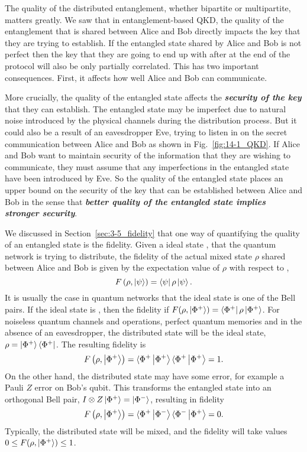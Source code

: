 The quality of the distributed entanglement, whether bipartite or multipartite, matters greatly.
We saw that in entanglement-based QKD, the quality of the entanglement that is shared between Alice and Bob directly impacts the key that they are trying to establish.
If the entangled state shared by Alice and Bob is not perfect then the key that they are going to end up with after at the end of the protocol will also be only partially correlated.
This has two important consequences.
First, it affects how well Alice and Bob can communicate.

More crucially, the quality of the entangled state affects the \textit{\textbf{security of the key}} that they can establish.
The entangled state may be imperfect due to natural noise introduced by the physical channels during the distribution process.
But it could also be a result of an eavesdropper Eve, trying to listen in on the secret communication between Alice and Bob as shown in Fig.~\ref{fig:14-1_QKD}.
If Alice and Bob want to maintain security of the information that they are wishing to communicate, they must assume that any imperfections in the entangled state have been introduced by Eve.
So the quality of the entangled state places an upper bound on the security of the key that can be established between Alice and Bob in the sense that \textit{\textbf{better quality of the entangled state implies stronger security}}.

We discussed in Section~\ref{sec:3-5_fidelity} that one way of quantifying the quality of an entangled state is the fidelity.
Given a ideal state \ket{\psi}, that the quantum network is trying to distribute, the fidelity of the actual mixed state $\rho$ shared between Alice and Bob is given by the expectation value of $\rho$ with respect to \ket{\psi},
\begin{equation}
    F \left( \rho, \left| \psi \right\rangle \right) = \left\langle \psi \right|\rho\left| \psi \right\rangle.
\end{equation}
It is usually the case in quantum networks that the ideal state is one of the Bell pairs.
If the ideal state is \ket{\Phi^+}, then the fidelity if $F (\rho, \left| \Phi^+ \right\rangle) = \left\langle \Phi^+ \right|\rho\left| \Phi^+ \right\rangle$.
For noiseless quantum channels and operations, perfect quantum memories and in the absence of an eavesdropper, the distributed state will be the ideal state, $\rho = \left| \Phi^+ \right\rangle\left\langle \Phi^+ \right|$.
The resulting fidelity is
\begin{equation}
    F \left( \rho, \left| \Phi^+ \right\rangle \right) = \langle\Phi^+\left| \Phi^+ \right\rangle \langle\Phi^+\left| \Phi^+ \right\rangle = 1.
\end{equation}
On the other hand, the distributed state may have some error, for example a Pauli $Z$ error on Bob's qubit.
This transforms the entangled state into an orthogonal Bell pair, $I \otimes Z \left| \Phi^+ \right\rangle = \left| \Phi^- \right\rangle$, resulting in fidelity
\begin{equation}
    F \left( \rho, \left| \Phi^+ \right\rangle \right) = \langle\Phi^+\left| \Phi^- \right\rangle \langle\Phi^-\left| \Phi^+ \right\rangle = 0.
    \label{eq:14-1_fidelity_0}
\end{equation}
Typically, the distributed state will be mixed, and the fidelity will take values $ 0 \leq F(\rho, \left| \Phi^+ \right\rangle) \leq 1$.

